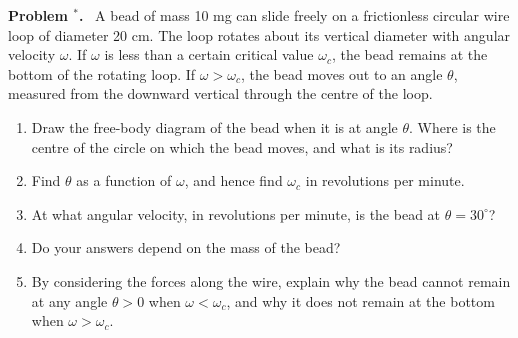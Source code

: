\documentclass[12pt]{article}
\newcounter{problem}
\newenvironment{problem}[1][]{\refstepcounter{problem}\par\medskip\noindent\textbf{Problem \theproblem#1.}\ }{\par}
\begin{document}
\newpage
\begin{problem}[$^\ast$]\label{prob:bead}
A bead of mass 10 mg can slide freely on a frictionless circular wire loop of diameter 20 cm. The loop rotates about its vertical diameter with angular velocity $\omega$. If $\omega$ is less than a certain critical value $\omega_c$, the bead remains at the bottom of the rotating loop. If $\omega > \omega_c$, the bead moves out to an angle $\theta$, measured from the downward vertical through the centre of the loop.

\begin{center}
\end{center}

\begin{enumerate}[label=(\alph*)]
  \item Draw the free-body diagram of the bead when it is at angle $\theta$. Where is the centre of the circle on which the bead moves, and what is its radius?
  \item Find $\theta$ as a function of $\omega$, and hence find $\omega_c$ in revolutions per minute.
  \item At what angular velocity, in revolutions per minute, is the bead at $\theta = 30^\circ$?
  \item Do your answers depend on the mass of the bead?
  \item[(e)$^\ast$] By considering the forces along the wire, explain why the bead cannot remain at any angle $\theta > 0$ when $\omega < \omega_c$, and why it does not remain at the bottom when $\omega > \omega_c$.
\end{enumerate}
\end{problem}
\end{document}
